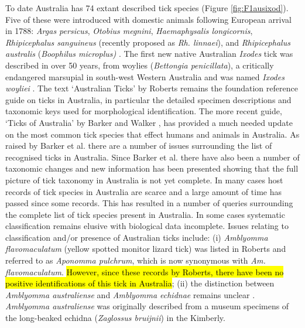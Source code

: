 \documentclass[a4paper, nobind]{templates/ociamthesis}
\begin{document}
To date Australia has 74 extant described tick species (Figure \ref{fig:F1ausixod}).
Five of these were introduced with domestic animals following European arrival in 1788: \emph{Argas persicus}, \emph{Otobius megnini}, \emph{Haemaphysalis longicornis}, \emph{Rhipicephalus sanguineus} (recently proposed as \emph{Rh. linnaei}), and \emph{Rhipicephalus australis} (\emph{Boophilus microplus)} \autocite{barkerTicksAustraliaSpecies2014}.
The first new native Australian \emph{Ixodes} tick was described in over 50 years, from woylies (\emph{Bettongia penicillata}), a critically endangered marsupial in south-west Western Australia and was named \emph{Ixodes woyliei} \autocite{ashMorphologicalMolecularDescription2017}.
The text `Australian Ticks' by Roberts \autocite*{robertsAustralianTicks1970} remains the foundation reference guide on ticks in Australia, in particular the detailed specimen descriptions and taxonomic keys used for morphological identification.
The more recent guide, `Ticks of Australia' by Barker and Walker \autocite*{barkerTicksAustraliaSpecies2014}, has provided a much needed update on the most common tick species that effect humans and animals in Australia.
As raised by Barker et al. \autocite*{barkerList70Species2014} there are a number of issues surrounding the list of recognised ticks in Australia.
Since Barker et al. \autocite*{barkerList70Species2014} there have also been a number of taxonomic changes and new information has been presented showing that the full picture of tick taxonomy in Australia is not yet complete.
In many cases host records of tick species in Australia are scarce and a large amount of time has passed since some records.
This has resulted in a number of queries surrounding the complete list of tick species present in Australia.
In some cases systematic classification remains elusive with biological data incomplete.
Issues relating to classification and/or presence of Australian ticks include:
(i) \emph{Amblyomma flavomaculatum} (yellow spotted monitor lizard tick) was listed in Roberts \autocite*{robertsAustralianSpeciesAponomma1953,robertsFurtherObservationsAustralian1964,robertsAustralianTicks1970} and referred to as \emph{Aponomma pulchrum}, which is now synonymous with \emph{Am. flavomaculatum}.
\hl{However, since these records by Roberts, there have been no positive identifications of this tick in Australia};
(ii) the distinction between \emph{Amblyomma australiense} and \emph{Amblyomma echidnae} remains unclear \autocite{guglielmoneCommentsControversialTick2009}. \emph{Amblyomma australiense} was originally described from a museum specimens of the long-beaked echidna (\emph{Zaglossus bruijnii}) in the Kimberly.
\end{document}
